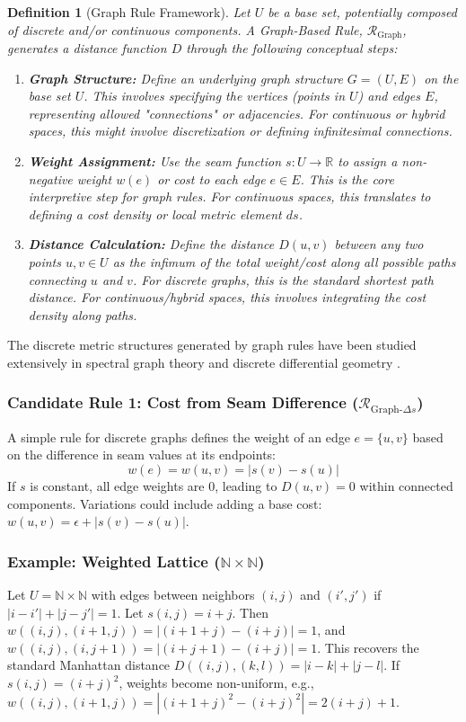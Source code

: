 \documentclass[twoside,twocolumn]{article}
\newtheorem{definition}{Definition}[subsection]
\numberwithin{equation}{section} %
\begin{document}
\begin{definition}[Graph Rule Framework]
Let $U$ be a base set, potentially composed of discrete and/or continuous components. A \emph{Graph-Based Rule}, $\mathcal{R}_{\text{Graph}}$, generates a distance function $D$ through the following conceptual steps:
\begin{enumerate}
    \item \textbf{Graph Structure:} Define an underlying graph structure $G = (U, E)$ on the base set $U$. This involves specifying the vertices (points in $U$) and edges $E$, representing allowed "connections" or adjacencies. For continuous or hybrid spaces, this might involve discretization or defining infinitesimal connections.
    \item \textbf{Weight Assignment:} Use the seam function $s: U \to \mathbb{R}$ to assign a non-negative weight $w(e)$ or cost to each edge $e \in E$. This is the core interpretive step for graph rules. For continuous spaces, this translates to defining a cost density or local metric element $ds$.
    \item \textbf{Distance Calculation:} Define the distance $D(u, v)$ between any two points $u, v \in U$ as the infimum of the total weight/cost along all possible paths connecting $u$ and $v$. For discrete graphs, this is the standard shortest path distance. For continuous/hybrid spaces, this involves integrating the cost density along paths.
\end{enumerate}
\end{definition}
The discrete metric structures generated by graph rules have been studied extensively in spectral graph theory \cite{Chung1997} and discrete differential geometry \cite{Bobenko2015}.

\subsubsection{Candidate Rule 1: Cost from Seam Difference ($\mathcal{R}_{\text{Graph-}\Delta s}$)}
A simple rule for discrete graphs defines the weight of an edge $e=\{u, v\}$ based on the difference in seam values at its endpoints:
$$ w(e) = w(u, v) = |s(v) - s(u)| $$
If $s$ is constant, all edge weights are 0, leading to $D(u,v)=0$ within connected components. Variations could include adding a base cost: $w(u, v) = \epsilon + |s(v) - s(u)|$.

\subsubsection{Example: Weighted Lattice ($\mathbb{N} \times \mathbb{N}$)}
Let $U = \mathbb{N} \times \mathbb{N}$ with edges between neighbors $(i, j)$ and $(i', j')$ if $|i-i'|+|j-j'|=1$. Let $s(i, j) = i + j$. Then $w((i,j), (i+1,j)) = |(i+1+j) - (i+j)| = 1$, and $w((i,j), (i,j+1)) = |(i+j+1) - (i+j)| = 1$. This recovers the standard Manhattan distance $D((i,j), (k,l)) = |i-k| + |j-l|$. If $s(i, j) = (i+j)^2$, weights become non-uniform, e.g., $w((i,j), (i+1,j)) = |(i+1+j)^2 - (i+j)^2| = 2(i+j)+1$.
\end{document}
